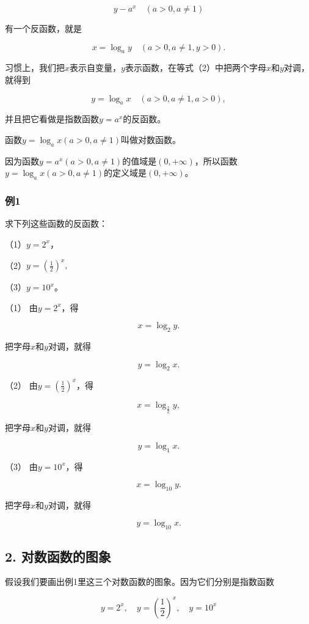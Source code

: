 \[
y - a^{x} \quad (a > 0, a \neq 1) \tag {1}
\]

有一个反函数，就是

\[
x = \log_{a} y \quad (a > 0, a \neq 1, y > 0). \tag {2}
\]

习惯上，我们把\(x\)表示自变量，\(y\)表示函数，在等式（2）中把两个字母\(x\)和\(y\)对调，就得到

\[
y = \log_{a} x \quad (a > 0, a \neq 1, a > 0), \tag {3}
\]

并且把它看做是指数函数\(y = a^x\)的反函数。

函数\(y = \log_a x (a > 0, a \neq 1)\)叫做对数函数。

因为函数\(y = a^x (a > 0, a \neq 1)\)的值域是\((0, +\infty)\)，所以函数\(y = \log_a x (a > 0, a \neq 1)\)的定义域是\((0, +\infty)\)。

\subsubsection{例1}

求下列这些函数的反函数：

（1）\(y = 2^x\)，

（2）\(y = \left(\frac{1}{2}\right)^x,\)

（3）\(y = 10^{x}\)。

 （1） 由\(y = 2^x\)，得

\[
x = \log_{2} y.
\]

把字母\(x\)和\(y\)对调，就得

\[
y = \log_{2} x.
\]

（2） 由\(y = \left(\frac{1}{2}\right)^x\)，得

\[
x = \log_{\frac{1}{2}} y,
\]

把字母\(x\)和\(y\)对调，就得

\[
y = \log_{1} x.
\]

（3） 由\(y = 10^x\)，得

\[
x = \log_{10} y.
\]

把字母\(x\)和\(y\)对调，就得

\[
y = \log_{10} x.
\]

\subsection{2. 对数函数的图象}

假设我们要画出例1里这三个对数函数的图象。因为它们分别是指数函数

\[
y = 2^{x}, \quad y = \left(\frac{1}{2}\right)^{x}, \quad y = 10^{x}
\]

